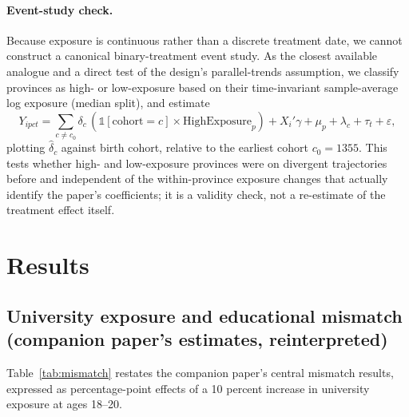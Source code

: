 \documentclass[11pt]{article}
\begin{document}
\paragraph{Event-study check.} Because exposure is continuous rather than a discrete treatment date, we cannot construct a canonical binary-treatment event study. As the closest available analogue and a direct test of the design's parallel-trends assumption, we classify provinces as high- or low-exposure based on their time-invariant sample-average log exposure (median split), and estimate
\begin{equation}
Y_{ipct} = \sum_{c \neq c_0} \delta_c\, (\mathbb{1}[\text{cohort}=c] \times \text{HighExposure}_p) + X_i'\gamma + \mu_p + \lambda_c + \tau_t + \varepsilon,
\end{equation}
plotting $\hat\delta_c$ against birth cohort, relative to the earliest cohort $c_0=1355$. This tests whether high- and low-exposure provinces were on divergent trajectories before and independent of the within-province exposure changes that actually identify the paper's coefficients; it is a validity check, not a re-estimate of the treatment effect itself.

\section{Results}

\subsection{University exposure and educational mismatch (companion paper's estimates, reinterpreted)}

Table~\ref{tab:mismatch} restates the companion paper's central mismatch results, expressed as percentage-point effects of a 10 percent increase in university exposure at ages 18--20.
\end{document}
